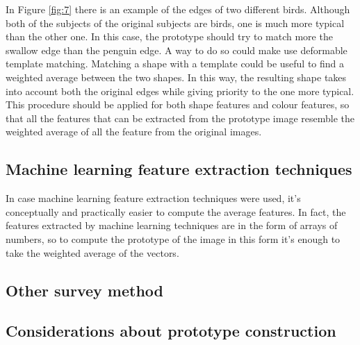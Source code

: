 \documentclass[conference]{IEEEtran}
\begin{document}
		\noindent In Figure \ref{fig:7} there is an example of the edges of two different birds. Although both of the subjects of the original 
		subjects are birds, one is much more typical than the other one. In this case, the prototype should try to match more the swallow edge than the penguin edge. A way to do so could make use deformable 
		template matching. Matching a shape with a template could be useful to find a weighted average between the two shapes. In this way, the resulting shape takes into account both the original edges while 
		giving priority to the one more typical.
		This procedure should be applied for both shape features and colour features, so that all the features that can be extracted from the prototype image resemble the weighted average of all the feature from 
		the original images. 

		\subsection{Machine learning feature extraction techniques}
		
			\noindent In case machine learning feature extraction techniques were used, it's conceptually and practically easier to compute the average features. In fact, the features extracted by machine learning techniques are 
			in the form of arrays of numbers, so to compute the prototype of the image in this form it's enough to take the weighted average of the vectors. 
			
		\subsection{Other survey method}
		
		
		\subsection{Considerations about prototype construction\label{sec:cpc}}
		
\end{document}
